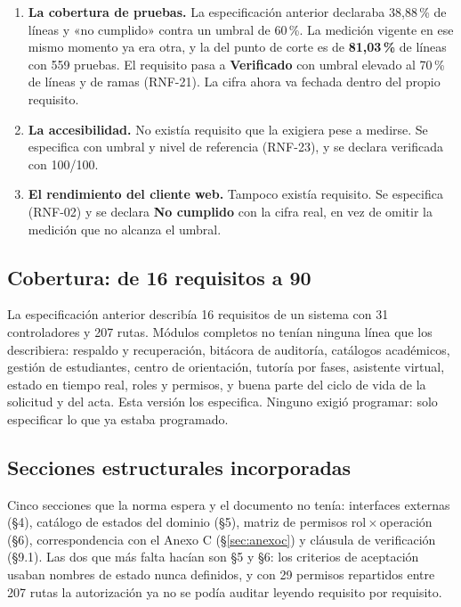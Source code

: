 \documentclass[11pt,a4paper]{article}
\newcommand{\estadoV}{\textcolor{verdeok}{\textbf{Verificado}}}
\newcommand{\estadoN}{\textcolor{rojoko}{\textbf{No cumplido}}}
\begin{document}
\begin{enumerate}
    \item \textbf{La cobertura de pruebas.} La especificación anterior declaraba 38,88\,\% de líneas y
          «no cumplido» contra un umbral de 60\,\%. La medición vigente en ese mismo momento ya
          era otra, y la del punto de corte es de \textbf{81,03\,\%} de líneas con 559 pruebas.
          El requisito pasa a \estadoV{} con umbral elevado al 70\,\% de líneas y de ramas
          (RNF-21). La cifra ahora va fechada dentro del propio requisito.
    \item \textbf{La accesibilidad.} No existía requisito que la exigiera pese a medirse. Se
          especifica con umbral y nivel de referencia (RNF-23), y se declara verificada con
          100/100.
    \item \textbf{El rendimiento del cliente web.} Tampoco existía requisito. Se especifica
          (RNF-02) y se declara \estadoN{} con la cifra real, en vez de omitir la medición que
          no alcanza el umbral.
\end{enumerate}

\subsection{Cobertura: de 16 requisitos a 90}

La especificación anterior describía 16 requisitos de un sistema con 31 controladores y 207 rutas.
Módulos completos no tenían ninguna línea que los describiera: respaldo y recuperación, bitácora
de auditoría, catálogos académicos, gestión de estudiantes, centro de orientación, tutoría por
fases, asistente virtual, estado en tiempo real, roles y permisos, y buena parte del ciclo de
vida de la solicitud y del acta. Esta versión los especifica. Ninguno exigió programar: solo
especificar lo que ya estaba programado.

\subsection{Secciones estructurales incorporadas}

Cinco secciones que la norma espera y el documento no tenía: interfaces externas (\S4), catálogo
de estados del dominio (\S5), matriz de permisos rol\,$\times$\,operación (\S6), correspondencia
con el Anexo C (\S\ref{sec:anexoc}) y cláusula de verificación (\S9.1). Las dos que más falta
hacían son \S5 y \S6: los criterios de aceptación usaban nombres de estado nunca definidos, y
con 29 permisos repartidos entre 207 rutas la autorización ya no se podía auditar leyendo
requisito por requisito.
\end{document}

